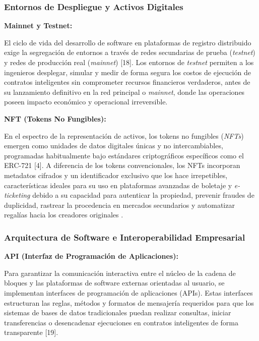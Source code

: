 \documentclass[12pt,a4paper]{article}
\begin{document}
\subsubsection{Entornos de Despliegue y Activos Digitales}

\textbf{Mainnet y Testnet:}

El ciclo de vida del desarrollo de software en plataformas de registro distribuido exige la segregación de entornos a través de redes secundarias de prueba (\textit{testnet}) y redes de producción real (\textit{mainnet}) [18]. Los entornos de \textit{testnet} permiten a los ingenieros desplegar, simular y medir de forma segura los costos de ejecución de contratos inteligentes sin comprometer recursos financieros verdaderos, antes de su lanzamiento definitivo en la red principal o \textit{mainnet}, donde las operaciones poseen impacto económico y operacional irreversible.

\textbf{NFT (Tokens No Fungibles):}

En el espectro de la representación de activos, los tokens no fungibles (\textit{NFTs}) emergen como unidades de datos digitales únicas y no intercambiables, programadas habitualmente bajo estándares criptográficos específicos como el ERC-721 [4]. A diferencia de los tokens convencionales, los NFTs incorporan metadatos cifrados y un identificador exclusivo que los hace irrepetibles, características ideales para su uso en plataformas avanzadas de boletaje y \textit{e-ticketing} debido a su capacidad para autenticar la propiedad, prevenir fraudes de duplicidad, rastrear la procedencia en mercados secundarios y automatizar regalías hacia los creadores originales .

\subsubsection{Arquitectura de Software e Interoperabilidad Empresarial}

\textbf{API (Interfaz de Programación de Aplicaciones):}

Para garantizar la comunicación interactiva entre el núcleo de la cadena de bloques y las plataformas de software externas orientadas al usuario, se implementan interfaces de programación de aplicaciones (APIs). Estas interfaces estructuran las reglas, métodos y formatos de mensajería requeridos para que los sistemas de bases de datos tradicionales puedan realizar consultas, iniciar transferencias o desencadenar ejecuciones en contratos inteligentes de forma transparente [19].
\end{document}
